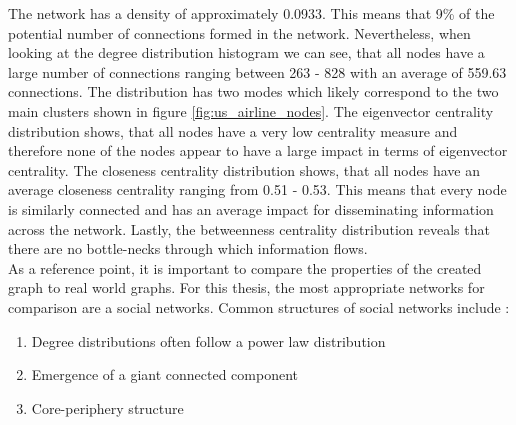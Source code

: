   \noindent The network has a density of approximately 0.0933. This means that 
  9\% of the potential number of connections formed in the network.
  Nevertheless, when looking at the degree distribution histogram we can see, 
  that all nodes have a large number of connections ranging between 263 -
  828 with an average of 559.63 connections. The distribution has two
  modes which likely correspond to the two main clusters shown in figure
  \ref{fig:us_airline_nodes}. The eigenvector centrality distribution shows, 
  that all nodes have a very low centrality measure and therefore none of the 
  nodes appear to have a large impact in terms of eigenvector centrality. The 
  closeness centrality distribution shows, that all nodes have an average 
  closeness centrality ranging from 0.51 - 0.53. This means that every node is 
  similarly connected and has an average impact for disseminating information 
  across the network. Lastly, the betweenness centrality distribution reveals 
  that there are no bottle-necks through which information flows. \\

  \noindent As a reference point, it is important to compare the properties of
  the created graph to real world graphs. For this thesis, the most appropriate
  networks for comparison are a social networks. Common structures of social 
  networks include \citep{watts1998collective,newman2006structure,Newman2010,
  kim2012multiplicative}:

  \begin{enumerate}
    \item Degree distributions often follow a power law distribution
    \item Emergence of a giant connected component
    \item Core-periphery structure
  \end{enumerate}

